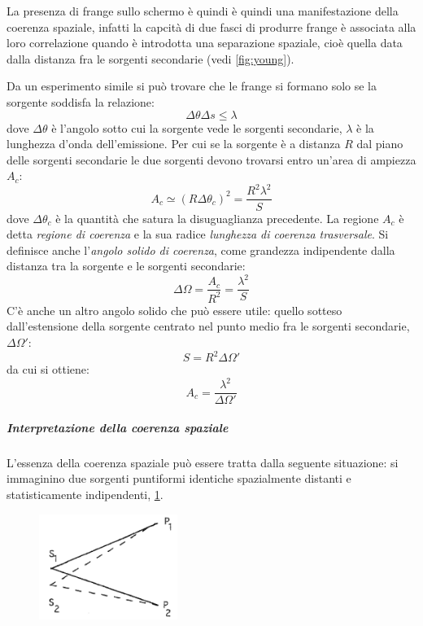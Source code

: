 La presenza di frange sullo schermo è quindi è quindi una manifestazione della coerenza spaziale, infatti la capcità di due fasci di produrre frange è associata alla loro correlazione quando è introdotta una separazione spaziale, cioè quella data dalla distanza fra le sorgenti secondarie (vedi \cref{fig:young}).

Da un esperimento simile si può trovare che le frange si formano solo se la sorgente soddisfa la relazione:
\[ \Delta \theta \Delta s \leq \lambda \]
dove $ \Delta\theta $ è l'angolo sotto cui la sorgente vede le sorgenti secondarie, $ \lambda $ è la lunghezza d'onda dell'emissione. Per cui se la sorgente è a distanza $ R $ dal piano delle sorgenti secondarie le due sorgenti devono trovarsi entro un'area di ampiezza $ A_c $:
\[ A_c \simeq (R\Delta\theta_c)^2 = \frac{R^2\lambda^2}{S} \]
dove $ \Delta\theta_c $ è la quantità che satura la disuguaglianza precedente. La regione $ A_c $ è detta \textit{regione di coerenza} e la sua radice \textit{lunghezza di coerenza trasversale}. Si definisce anche l'\textit{angolo solido di coerenza}, come grandezza indipendente dalla distanza tra la sorgente e le sorgenti secondarie:
\[ \Delta\Omega = \frac{A_c}{R^2} = \frac{\lambda^2}{S} \]
C'è anche un altro angolo solido che può essere utile: quello sotteso dall'estensione della sorgente centrato nel punto medio fra le sorgenti secondarie, $ \Delta\Omega' $:
\[ S =  R^2 \Delta\Omega'\]
da cui si ottiene:
\[ A_c = \frac{\lambda^2}{\Delta\Omega'} \]

 \subparagraph{Interpretazione della coerenza spaziale} L'essenza della coerenza spaziale può essere tratta dalla seguente situazione: si immaginino due sorgenti puntiformi identiche spazialmente distanti e statisticamente indipendenti, \cref{fig:spcoh}.

\begin{figure}[h]
	\centering
	\includegraphics[width=0.4\textwidth]{Immagini/Spatialcoh.png}
	\vspace{-10pt}
	\caption{}
	\label{fig:spcoh}
	\vspace{-10pt}
\end{figure}

